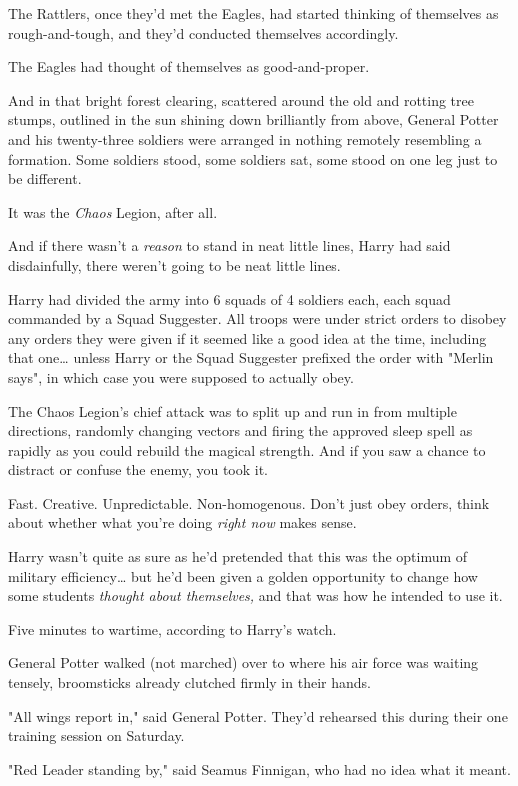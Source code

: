 The Rattlers, once they'd met the Eagles, had started thinking of themselves as rough-and-tough, and they'd conducted themselves accordingly.

The Eagles had thought of themselves as good-and-proper.

And in that bright forest clearing, scattered around the old and rotting tree stumps, outlined in the sun shining down brilliantly from above, General Potter and his twenty-three soldiers were arranged in nothing remotely resembling a formation. Some soldiers stood, some soldiers sat, some stood on one leg just to be different.

It was the \emph{Chaos} Legion, after all.

And if there wasn't a \emph{reason} to stand in neat little lines, Harry had said disdainfully, there weren't going to be neat little lines.

Harry had divided the army into 6 squads of 4 soldiers each, each squad commanded by a Squad Suggester. All troops were under strict orders to disobey any orders they were given if it seemed like a good idea at the time, including that one{\ldots} unless Harry or the Squad Suggester prefixed the order with "Merlin says", in which case you were supposed to actually obey.

The Chaos Legion's chief attack was to split up and run in from multiple directions, randomly changing vectors and firing the approved sleep spell as rapidly as you could rebuild the magical strength. And if you saw a chance to distract or confuse the enemy, you took it.

Fast. Creative. Unpredictable. Non-homogenous. Don't just obey orders, think about whether what you're doing \emph{right now} makes sense.

Harry wasn't quite as sure as he'd pretended that this was the optimum of military efficiency{\ldots} but he'd been given a golden opportunity to change how some students \emph{thought about themselves,} and that was how he intended to use it.

Five minutes to wartime, according to Harry's watch.

General Potter walked (not marched) over to where his air force was waiting tensely, broomsticks already clutched firmly in their hands.

"All wings report in," said General Potter. They'd rehearsed this during their one training session on Saturday.

"Red Leader standing by," said Seamus Finnigan, who had no idea what it meant.

